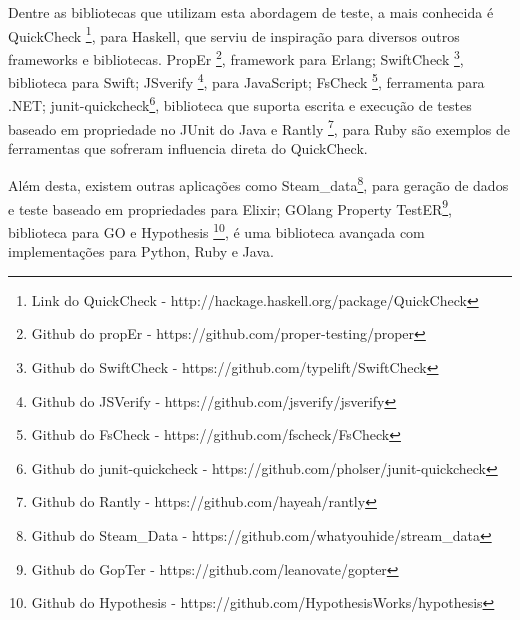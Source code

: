  Dentre as bibliotecas que utilizam esta abordagem de teste, a mais conhecida é QuickCheck \footnote{Link do QuickCheck - http://hackage.haskell.org/package/QuickCheck}, para Haskell, que serviu de inspiração para diversos outros frameworks e bibliotecas. PropEr \footnote{Github do propEr - https://github.com/proper-testing/proper}, framework para Erlang; SwiftCheck \footnote{Github do SwiftCheck - https://github.com/typelift/SwiftCheck}, biblioteca para Swift; JSverify \footnote{Github do JSVerify - https://github.com/jsverify/jsverify}, para JavaScript; FsCheck \footnote{Github do FsCheck - https://github.com/fscheck/FsCheck}, ferramenta para .NET; junit-quickcheck\footnote{Github do junit-quickcheck - https://github.com/pholser/junit-quickcheck}, biblioteca que suporta escrita e execução de testes baseado em propriedade no JUnit do Java e Rantly \footnote{Github do Rantly - https://github.com/hayeah/rantly}, para Ruby são exemplos de ferramentas que sofreram influencia direta do QuickCheck.
 
 Além desta, existem outras aplicações como Steam\_data\footnote{Github do Steam\_Data - https://github.com/whatyouhide/stream\_data}, para geração de dados e teste baseado em propriedades para Elixir; GOlang Property TestER\footnote{Github do GopTer - https://github.com/leanovate/gopter}, biblioteca para GO e Hypothesis \footnote{Github do Hypothesis - https://github.com/HypothesisWorks/hypothesis}, é uma biblioteca avançada com implementações para Python, Ruby e Java.

 
